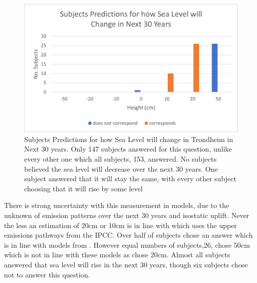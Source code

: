 \paragraph{}

\begin{figure}[h!]
    \centering
    \includegraphics{fig_results/slr-future.png}
    \caption{Subjects Predictions for how Sea Level will change in Trondheim in Next 30 years. Only 147 subjects answered for this question, unlike every other one which all subjects, 153, answered. No subjects believed the sea level will decrease over the next 30 years. One subject answered that it will stay the same, with every other subject choosing that it will rise by some level }
    \label{fig:my_label}
\end{figure}

There is strong uncertainty with this measurement in models, due to the unknown of emission patterns over the next 30 years and isostatic uplift. Never the less an estimation of 20cm or 10cm is in line with \cite{kartverket_se_2021} which uses the upper emissions pathways from the IPCC. Over half of subjects chose an answer which is in line with models from \cite{kartverket_se_2021}. However equal numbers of subjects,26, chose 50cm which is not in line with these models as chose 20cm. Almost all subjects answered that sea level will rise in the next 30 years, though six subjects chose not to answer this question.  

